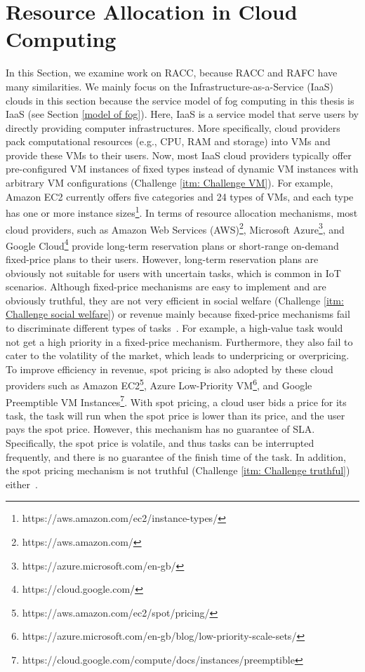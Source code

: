 \documentclass[11pt]{phdthesis}
\begin{document}
\section{Resource Allocation in Cloud Computing } \label{cloud computing resource allocation}
In this Section, we examine work on RACC, because RACC and RAFC have many similarities. We mainly focus on the Infrastructure-as-a-Service (IaaS) clouds in this section because the service model of fog computing in this thesis is IaaS (see Section \ref{model of fog}). Here, IaaS is a service model that serve users by directly providing computer infrastructures. More specifically, cloud providers pack computational resources (e.g., CPU, RAM and storage) into VMs and provide these VMs to their users. Now, most IaaS cloud providers typically offer pre-configured VM instances of fixed types instead of dynamic VM instances with arbitrary VM configurations (Challenge \ref{itm: Challenge VM}). For example, Amazon EC2 currently offers five categories and 24 types of VMs, and each type has one or more instance sizes\footnote{https://aws.amazon.com/ec2/instance-types/}. In terms of resource allocation mechanisms, most cloud providers, such as Amazon Web Services (AWS)\footnote{https://aws.amazon.com/}, Microsoft Azure\footnote{https://azure.microsoft.com/en-gb/}, and Google Cloud\footnote{https://cloud.google.com/} provide long-term reservation plans or short-range on-demand fixed-price plans to their users. However, long-term reservation plans are obviously not suitable for users with uncertain tasks, which is common in IoT scenarios.  Although fixed-price mechanisms are easy to implement and are obviously truthful, they are not very efficient in social welfare (Challenge \ref{itm: Challenge social welfare}) or revenue mainly because fixed-price mechanisms fail to discriminate different types of tasks~\citep{al2013cloud}. For example, a high-value task would not get a high priority in a fixed-price mechanism. Furthermore, they also fail to cater to the volatility of the market, which leads to underpricing or overpricing. To improve efficiency in revenue, spot pricing is also adopted by these cloud providers such as
Amazon EC2\footnote{https://aws.amazon.com/ec2/spot/pricing/}, Azure Low-Priority VM\footnote{https://azure.microsoft.com/en-gb/blog/low-priority-scale-sets/}, and Google Preemptible VM Instances\footnote{https://cloud.google.com/compute/docs/instances/preemptible}. With spot pricing, a cloud user bids a price for its task, the task will run when the spot price is lower than its price, and the user pays the spot price. However, this mechanism has no guarantee of SLA. Specifically, the spot price is volatile, and thus tasks can be interrupted frequently, and there is no guarantee of the finish time of the task. In addition, the spot pricing mechanism is not truthful (Challenge \ref{itm: Challenge truthful}) either~\citep{wang2012cloud}.
\end{document}
